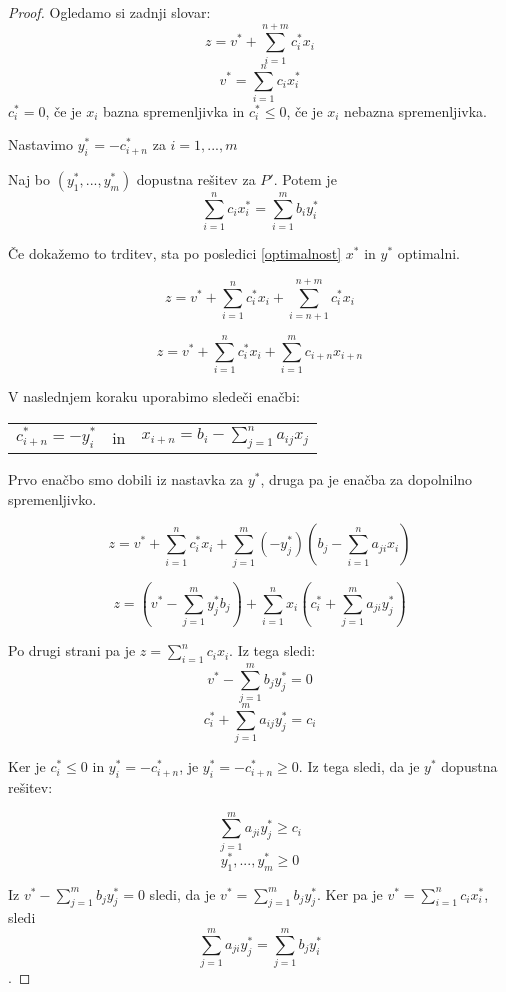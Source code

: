 \documentclass[11pt, a4paper]{article}
\begin{document}
    \begin{proof}
        Ogledamo si zadnji slovar:
        \[z=v^* + \sum_{i=1}^{n+m} c_i^*x_i\]
        \[v^* = \sum_{i=1}^{n} c_i x_i^*\]
        \(c_i^*=0\), če je \(x_i\) bazna spremenljivka in \(c_i^* \le 0\), če je \(x_i\) nebazna spremenljivka.
        
        Nastavimo \(y_i^* = -c_{i+n}^*\) za \(i=1,...,m\)
        
        \begin{proposition}
            Naj bo \((y_1^*,...,y_m^*)\) dopustna rešitev za \(P'\). Potem je \[\sum_{i=1}^n c_i x_i^* = \sum_{i=1}^m b_i y_i^*\]
        \end{proposition}

        Če dokažemo to trditev, sta po posledici \ref{optimalnost} \(x^*\) in \(y^*\) optimalni.

        \[z = v^* + \sum_{i=1}^n c_i^* x_i + \sum_{i=n+1}^{n+m} c_i^* x_i\]
        
        \[z = v^* + \sum_{i=1}^n c_i^* x_i + \sum_{i=1}^m c_{i+n} x_{i+n}\]
       
        
        V naslednjem koraku uporabimo sledeči enačbi:
        
        \begin{center}
            \begin{tabular}{ c c c }
                \(c_{i+n}^* = -y_i^*\) & in & \(x_{i+n} = b_i - \sum_{j=1}^n a_{ij} x_j\)
            \end{tabular}
        \end{center}

        Prvo enačbo smo dobili iz nastavka za \(y^*\), druga pa je enačba za dopolnilno spremenljivko.
            
        
        \[z = v^* +\sum_{i=1}^n c_i^* x_i + \sum_{j=1}^m (-y_j^*)(b_j - \sum_{i=1}^n a_{ji} x_i)\]
        
        \[z = (v^* - \sum_{j=1}^m y_j^* b_j) + \sum_{i=1}^n x_i (c_i^* + \sum_{j=1}^m a_{ji} y_j^*)\]

        Po drugi strani pa je \(z = \sum_{i=1}^n c_i x_i\). Iz tega sledi:
        \[v^* - \sum_{j=1}^m b_j y_j^* = 0\]
        \[c_i^* + \sum_{j=1}^m a_{ij} y_j^* = c_i\]

        Ker je \(c_i^* \le 0\) in \(y_i^* = -c_{i+n}^*\), je \(y_i^* = -c_{i+n}^* \ge 0\). Iz tega sledi, da je \(y^*\) dopustna rešitev:

        \[\sum_{j=1}^m a_{ji} y_j^* \ge c_i\]
        \[y_1^*,...,y_m^* \ge 0\]

        Iz \(v^* - \sum_{j=1}^m b_j y_j^* = 0\) sledi, da je 
        \(v^* = \sum_{j=1}^m b_j y_j^*\).
        Ker pa je \(v^* = \sum_{i=1}^{n} c_i x_i^*\), sledi 
        \[\sum_{j=1}^m a_{ji} y_j^* = \sum_{j=1}^m b_j y_i^*\].
    \end{proof}
\end{document}
